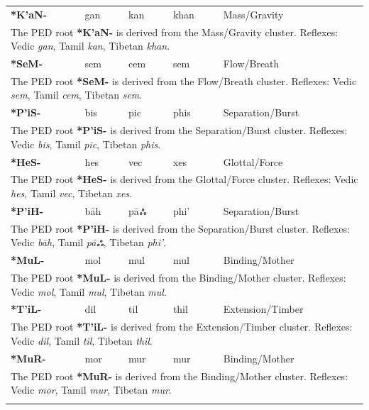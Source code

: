 \begin{longtable}{p{} p{} p{} p{} p{}}
\textbf{*K'aN-} & gan & kan & khan & Mass/Gravity \\ 
\multicolumn{5}{p{\textwidth}}{\small The PED root \textbf{*K'aN-} is derived from the Mass/Gravity cluster. Reflexes: Vedic \textit{gan}, Tamil \textit{kan}, Tibetan \textit{khan}. } \\ \addlinespace 
\textbf{*SeM-} & sem & cem & sem & Flow/Breath \\ 
\multicolumn{5}{p{\textwidth}}{\small The PED root \textbf{*SeM-} is derived from the Flow/Breath cluster. Reflexes: Vedic \textit{sem}, Tamil \textit{cem}, Tibetan \textit{sem}. } \\ \addlinespace 
\textbf{*P'iS-} & bis & pic & phis & Separation/Burst \\ 
\multicolumn{5}{p{\textwidth}}{\small The PED root \textbf{*P'iS-} is derived from the Separation/Burst cluster. Reflexes: Vedic \textit{bis}, Tamil \textit{pic}, Tibetan \textit{phis}. } \\ \addlinespace 
\textbf{*HeS-} & hes & vec & xes & Glottal/Force \\ 
\multicolumn{5}{p{\textwidth}}{\small The PED root \textbf{*HeS-} is derived from the Glottal/Force cluster. Reflexes: Vedic \textit{hes}, Tamil \textit{vec}, Tibetan \textit{xes}. } \\ \addlinespace 
\textbf{*P'iH-} & bāh & pāஃ & phi' & Separation/Burst \\ 
\multicolumn{5}{p{\textwidth}}{\small The PED root \textbf{*P'iH-} is derived from the Separation/Burst cluster. Reflexes: Vedic \textit{bāh}, Tamil \textit{pāஃ}, Tibetan \textit{phi'}. } \\ \addlinespace 
\textbf{*MuL-} & mol & mul & mul & Binding/Mother \\ 
\multicolumn{5}{p{\textwidth}}{\small The PED root \textbf{*MuL-} is derived from the Binding/Mother cluster. Reflexes: Vedic \textit{mol}, Tamil \textit{mul}, Tibetan \textit{mul}. } \\ \addlinespace 
\textbf{*T'iL-} & dil & til & thil & Extension/Timber \\ 
\multicolumn{5}{p{\textwidth}}{\small The PED root \textbf{*T'iL-} is derived from the Extension/Timber cluster. Reflexes: Vedic \textit{dil}, Tamil \textit{til}, Tibetan \textit{thil}. } \\ \addlinespace 
\textbf{*MuR-} & mor & mur & mur & Binding/Mother \\ 
\multicolumn{5}{p{\textwidth}}{\small The PED root \textbf{*MuR-} is derived from the Binding/Mother cluster. Reflexes: Vedic \textit{mor}, Tamil \textit{mur}, Tibetan \textit{mur}. } \\ \addlinespace 

\end{longtable}
